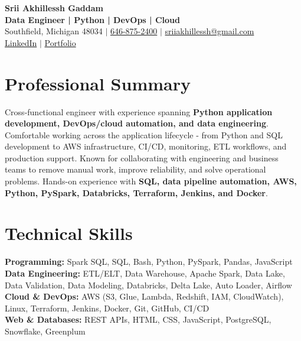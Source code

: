 \documentclass[letterpaper,10pt]{article}
\begin{document}
\fontsize{9.35pt}{10.45pt}\selectfont

\begin{center}
    {\LARGE \textbf{Srii Akhillessh Gaddam}} \\[-1pt]
    \textbf{Data Engineer | Python | DevOps | Cloud} \\[2pt]
    Southfield, Michigan 48034 $|$
    \href{tel:6468752400}{646-875-2400} $|$
    \href{mailto:sriiakhillessh@gmail.com}{sriiakhillessh@gmail.com} \\[1pt]
    \href{https://www.linkedin.com/in/srii-akhiilessh-gaddam-b48668191/}{LinkedIn} $|$
    \href{https://sriiakhillesshg.github.io/portfolio/}{Portfolio}
\end{center}
\vspace{-8pt}

\section{Professional Summary}
\small{Cross-functional engineer with experience spanning \textbf{Python application development, DevOps/cloud automation, and data engineering}. Comfortable working across the application lifecycle - from Python and SQL development to AWS infrastructure, CI/CD, monitoring, ETL workflows, and production support. Known for collaborating with engineering and business teams to remove manual work, improve reliability, and solve operational problems. Hands-on experience with \textbf{SQL, data pipeline automation, AWS, Python, PySpark, Databricks, Terraform, Jenkins, and Docker}.}

\section{Technical Skills}
\small{
\textbf{Programming:} Spark SQL, SQL, Bash, Python, PySpark, Pandas, JavaScript \\
\textbf{Data Engineering:} ETL/ELT, Data Warehouse, Apache Spark, Data Lake, Data Validation, Data Modeling, Databricks, Delta Lake, Auto Loader, Airflow \\
\textbf{Cloud \& DevOps:} AWS (S3, Glue, Lambda, Redshift, IAM, CloudWatch), Linux, Terraform, Jenkins, Docker, Git, GitHub, CI/CD \\
\textbf{Web \& Databases:} REST APIs, HTML, CSS, JavaScript, PostgreSQL, Snowflake, Greenplum
}
\end{document}
